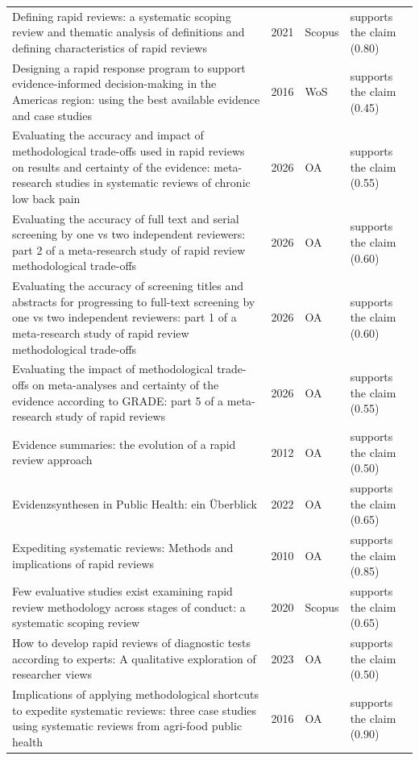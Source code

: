 \begin{longtable}{@{}%
  >{\raggedright\arraybackslash}p{}c%
  >{\raggedright\arraybackslash}p{}%
  >{\raggedright\arraybackslash}p{}@{}}
Defining rapid reviews: a systematic scoping review and thematic analysis of definitions and defining characteristics of rapid reviews & 2021 & Scopus & supports the claim (0.80) \\
Designing a rapid response program to support evidence-informed decision-making in the Americas region: using the best available evidence and case studies & 2016 & WoS & supports the claim (0.45) \\
Evaluating the accuracy and impact of methodological trade-offs used in rapid reviews on results and certainty of the evidence: meta-research studies in systematic reviews of chronic low back pain & 2026 & OA & supports the claim (0.55) \\
Evaluating the accuracy of full text and serial screening by one vs two independent reviewers: part 2 of a meta-research study of rapid review methodological trade-offs & 2026 & OA & supports the claim (0.60) \\
Evaluating the accuracy of screening titles and abstracts for progressing to full-text screening by one vs two independent reviewers: part 1 of a meta-research study of rapid review methodological trade-offs & 2026 & OA & supports the claim (0.60) \\
Evaluating the impact of methodological trade-offs on meta-analyses and certainty of the evidence according to GRADE: part 5 of a meta-research study of rapid reviews & 2026 & OA & supports the claim (0.55) \\
Evidence summaries: the evolution of a rapid review approach & 2012 & OA & supports the claim (0.50) \\
Evidenzsynthesen in Public Health: ein Überblick & 2022 & OA & supports the claim (0.65) \\
Expediting systematic reviews: Methods and implications of rapid reviews & 2010 & OA & supports the claim (0.85) \\
Few evaluative studies exist examining rapid review methodology across stages of conduct: a systematic scoping review & 2020 & Scopus & supports the claim (0.65) \\
How to develop rapid reviews of diagnostic tests according to experts: A qualitative exploration of researcher views & 2023 & OA & supports the claim (0.50) \\
Implications of applying methodological shortcuts to expedite systematic reviews: three case studies using systematic reviews from agri-food public health & 2016 & OA & supports the claim (0.90) \\

\end{longtable}
